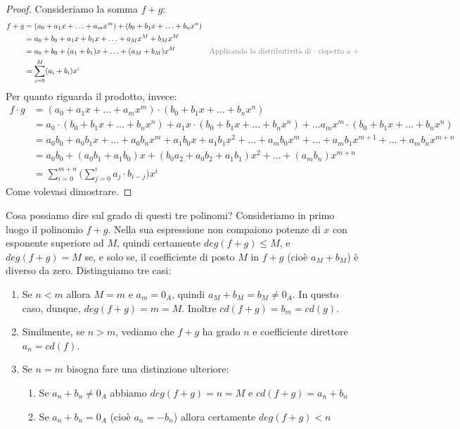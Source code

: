 \begin{proof}
	Consideriamo la somma $f+g$:
	\begin{align*}
		f+g &= (a_{0}+a_{1}x+\ldots+a_{m}x^{m})+(b_{0}+b_{1}x+\ldots+b_{n}x^{n})\\
		&= a_{0}+b_{0}+a_{1}x+b_{1}x+\ldots+a_{M}x^{M}+b_{M}x^{M} \\
		&= a_{0}+b_{0}+(a_{1}+b_{1})x+\ldots+(a_{M}+b_{M})x^{M} & \text{\textcolor{gray}{Applicando la distributività di $\cdot$ rispetto a $+$}}\\
		&= \sum_{i=0}^{M} (a_{i}+b_{i})x^{i}
	\end{align*}
	Per quanto riguarda il prodotto, invece:
	\begin{align*}
		f \cdot g &= (a_{0}+a_{1}x+\ldots+a_{m}x^{m}) \cdot (b_{0}+b_{1}x+\ldots+b_{n}x^{n})\\
		&= a_{0} \cdot (b_{0}+b_{1}x+\ldots+b_{n}x^{n}) + a_{1}x \cdot (b_{0}+b_{1}x+\ldots+b_{n}x^{n}) + \ldots a_{m}x^{m}\cdot (b_{0}+b_{1}x+\ldots+b_{n}x^{n}) \\
		&= a_{0}b_{0} + a_{0}b_{1}x + \ldots + a_{0}b_{n}x^{m} + a_{1}b_{0}x + a_{1}b_{1}x^{2}+\ldots+ a_{m}b_{0}x^{m}+ \ldots + a_{m}b_{1}x^{m+1}+ \ldots + a_{m}b_{n} x^{m+n} \\
		&= a_{0}b_{0} +(a_{0}b_{1}+a_{1}b_{0})x+(b_{0}a_{2}+a_{0}b_{2}+a_{1}b_{1})x^{2} + \ldots + (a_{m}b_{n})x^{m+n} \\
		&= \sum_{i=0}^{m+n}\bigl(\sum_{j=0}^{i}a_{j}\cdot b_{i-j}\bigr)x^{i}
	\end{align*}
	Come volevasi dimostrare.
\end{proof}

Cosa possiamo dire sul grado di questi tre polinomi? Consideriamo in primo luogo il polinomio $f+g$. Nella sua espressione non compaiono potenze di $x$ con esponente superiore ad $M$, quindi certamente $deg(f+g)\leq M$, e $deg(f+g)=M$ se, e solo se, il coefficiente di posto $M$ in $f+g$ (cioè $a_{M}+b_{M}$) è diverso da zero. Distinguiamo tre casi:
\begin{enumerate}
	\item Se $n<m$ allora $M=m$ e $a_{m}=0_{A}$, quindi $a_{M}+b_{M}=b_{M} \neq 0_{A}$. In questo caso, dunque, $deg (f+g)=m=M$. Inoltre $cd(f+g)=b_{m}=cd(g)$.
	\item Similmente, se $n>m$, vediamo che $f+g$ ha grado $n$ e coefficiente direttore $a_{n}=cd(f)$.
	\item Se $n=m$ bisogna fare una distinzione ulteriore: 
	\begin{enumerate}
		\item Se $a_{n}+b_{n}\neq 0_{A}$ abbiamo $deg(f+g) = n = M$ e $cd (f+g) = a_{n}+b_{n}$
		\item Se $a_{n}+b_{n} = 0_{A}$ (cioè $a_{n}=-b_{n}$) allora certamente $deg(f+g)<n$
	\end{enumerate}
\end{enumerate}



